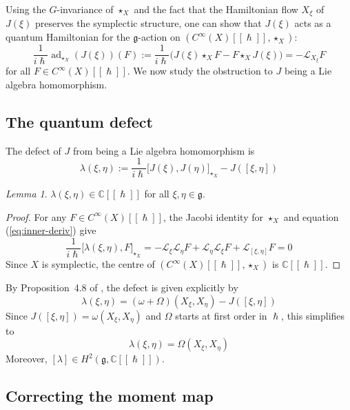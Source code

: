 \documentclass[
  12pt,
  a4paper, oneside
]{report}
\renewcommand{\hbar}{\hslash}
\theoremstyle{bolddef}
\theoremstyle{remark}
\newtheorem{lemma}[theorem]{Lemma}
\numberwithin{equation}{chapter}
\begin{document}
Using the $G$-invariance of $\star_X$ and the fact that the Hamiltonian flow $X_\xi$ of $J(\xi)$ preserves the symplectic structure, one can show that $J(\xi)$ acts as a quantum Hamiltonian for the $\mathfrak{g}$-action on $(C^\infty(X)[[\hbar]], \star_X)$:
\begin{equation}\label{eq:inner-deriv}
\frac{1}{i\hbar}\operatorname{ad}_{\star_X}(J(\xi))(F) := \frac{1}{i\hbar}\big(J(\xi) \star_X F - F \star_X J(\xi)\big) = -\mathcal{L}_{X_\xi} F
\end{equation}
for all $F \in C^\infty(X)[[\hbar]]$. We now study the obstruction to $J$ being a Lie algebra homomorphism.


\subsection*{The quantum defect}

The defect of $J$ from being a Lie algebra homomorphism is
\begin{equation}\label{eq:defect-def}
\lambda(\xi, \eta) := \frac{1}{i\hbar}\big[J(\xi), J(\eta)\big]_{\star_X} - J([\xi, \eta])
\end{equation}

\begin{lemma}\label{lem:defect-central}
$\lambda(\xi, \eta) \in \mathbb{C}[[\hbar]]$ for all $\xi, \eta \in \mathfrak{g}$.
\end{lemma}
\begin{proof}
For any $F \in C^\infty(X)[[\hbar]]$, the Jacobi identity for $\star_X$ and equation (\ref{eq:inner-deriv}) give
\[
\frac{1}{i\hbar}\big[\lambda(\xi, \eta), F\big]_{\star_X} = -\mathcal{L}_\xi \mathcal{L}_\eta F + \mathcal{L}_\eta \mathcal{L}_\xi F + \mathcal{L}_{[\xi,\eta]} F = 0
\]
Since $X$ is symplectic, the centre of $(C^\infty(X)[[\hbar]], \star_X)$ is $\mathbb{C}[[\hbar]]$.
\end{proof}

By Proposition~4.8 of \cite{MBN}, the defect is given explicitly by
\[
\lambda(\xi, \eta) = (\omega + \Omega)(X_\xi, X_\eta) - J([\xi, \eta])
\]
Since $J([\xi, \eta]) = \omega(X_\xi, X_\eta)$ and $\Omega$ starts at first order in $\hbar$, this simplifies to
\begin{equation}\label{eq:defect-Omega}
\lambda(\xi, \eta) = \Omega(X_\xi, X_\eta)
\end{equation}
Moreover, $[\lambda] \in H^2(\mathfrak{g}, \mathbb{C}[[\hbar]])$.


\subsection*{Correcting the moment map}
\end{document}
